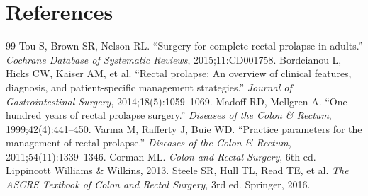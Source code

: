 \section*{References}
\begin{thebibliography}{99}
 Tou S, Brown SR, Nelson RL. ``Surgery for complete rectal prolapse in adults.'' \textit{Cochrane Database of Systematic Reviews}, 2015;11:CD001758.
 Bordcianou L, Hicks CW, Kaiser AM, et al. ``Rectal prolapse: An overview of clinical features, diagnosis, and patient-specific management strategies.'' \textit{Journal of Gastrointestinal Surgery}, 2014;18(5):1059--1069.
 Madoff RD, Mellgren A. ``One hundred years of rectal prolapse surgery.'' \textit{Diseases of the Colon \& Rectum}, 1999;42(4):441--450.
 Varma M, Rafferty J, Buie WD. ``Practice parameters for the management of rectal prolapse.'' \textit{Diseases of the Colon \& Rectum}, 2011;54(11):1339--1346.
 Corman ML. \textit{Colon and Rectal Surgery}, 6th ed. Lippincott Williams \& Wilkins, 2013.
 Steele SR, Hull TL, Read TE, et al. \textit{The ASCRS Textbook of Colon and Rectal Surgery}, 3rd ed. Springer, 2016.
\end{thebibliography}
